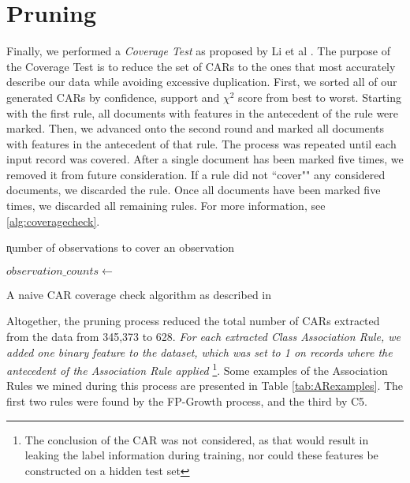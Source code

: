   \section{Pruning}
  
Finally, we performed a \textit{Coverage Test} as proposed by Li et al \cite{cmar}. The purpose of the \textsf{Coverage Test} is to reduce the set of CARs to the ones that most accurately describe our data while avoiding excessive duplication. First, we sorted all of our generated CARs by confidence, support and $\chi^2$ score from best to worst. Starting with the first rule, all documents with features in the antecedent of the rule were marked. Then, we advanced onto the second round and marked all documents with features in the antecedent of that rule. The process was repeated until each input record was covered. After a single document has been marked five times, we removed it from future consideration. If a rule did not ``cover"" any considered documents, we discarded the rule. Once all documents have been marked five times, we discarded all remaining rules. For more information, see \ref{alg:coveragecheck}.
 
\begin{algorithm}[h]

\k{number of observations to cover an observation}
\BlankLine

$observation\_counts \gets$  \;
\caption{A naive CAR coverage check algorithm as described in \cite{cmar}} \label{alg:coveragecheck}
\end{algorithm}
 
 
 Altogether, the pruning process reduced the total number of CARs extracted from the data from 345,373 to 628.
 \textit{For each extracted Class Association Rule, we added one binary feature to the dataset,
 which was set to 1 on records where the antecedent of the Association Rule applied} \footnote{The conclusion of the CAR was not considered, as that would result in leaking the label information during training, nor could these features be constructed on a hidden test set}. Some examples
 of the Association Rules we mined during this process are presented in Table \ref{tab:ARexamples}. The first two rules were found by the \textsf{FP-Growth}
 process, and the third by \textsf{C5}.
 
